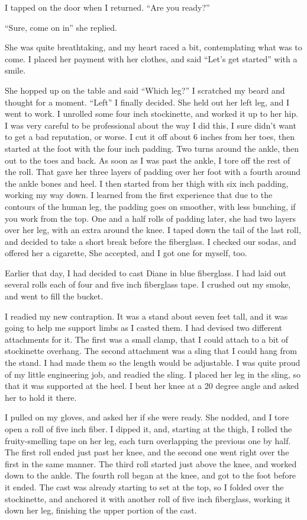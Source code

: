 I tapped on the door when I returned. ``Are you ready?''

``Sure, come on in'' she replied.

She was quite breathtaking, and my heart raced a bit, contemplating what was to come. I placed
her payment with her clothes, and said ``Let's get started'' with a smile.

She hopped up on the table and said ``Which leg?'' I scratched my beard and thought for a
moment. ``Left'' I finally decided. She held out her left leg, and I went to work. I unrolled
some four inch stockinette, and worked it up to her hip. I was very careful to be professional
about the way I did this, I sure didn't want to get a bad reputation, or worse. I cut it off
about 6 inches from her toes, then started at the foot with the four inch padding. Two turns
around the ankle, then out to the toes and back. As soon as I was past the ankle, I tore off the
rest of the roll. That gave her three layers of padding over her foot with a fourth around the
ankle bones and heel. I then started from her thigh with six inch padding, working my way down.
I learned from the first experience that due to the contours of the human leg, the padding goes
on smoother, with less bunching, if you work from the top. One and a half rolls of padding
later, she had two layers over her leg, with an extra around the knee. I taped down the tail of
the last roll, and decided to take a short break before the fiberglass. I checked our sodas, and
offered her a cigarette, She accepted, and I got one for myself, too.

Earlier that day, I had decided to cast Diane in blue fiberglass. I had laid out several rolls
each of four and five inch fiberglass tape. I crushed out my smoke, and went to fill the bucket.

I readied my new contraption. It was a stand about seven feet tall, and it was going to help me
support limbs as I casted them. I had devised two different attachments for it. The first was a
small clamp, that I could attach to a bit of stockinette overhang. The second attachment was a
sling that I could hang from the stand. I had made them so the length would be adjustable. I was
quite proud of my little engineering job, and readied the sling. I placed her leg in the sling,
so that it was supported at the heel. I bent her knee at a 20 degree angle and asked her to hold
it there.

I pulled on my gloves, and asked her if she were ready. She nodded, and I tore open a roll of
five inch fiber. I dipped it, and, starting at the thigh, I rolled the fruity-smelling tape on
her leg, each turn overlapping the previous one by half. The first roll ended just past her
knee, and the second one went right over the first in the same manner. The third roll started
just above the knee, and worked down to the ankle. The fourth roll began at the knee, and got to
the foot before it ended. The cast was already starting to set at the top, so I folded over the
stockinette, and anchored it with another roll of five inch fiberglass, working it down her leg,
finishing the upper portion of the cast.

